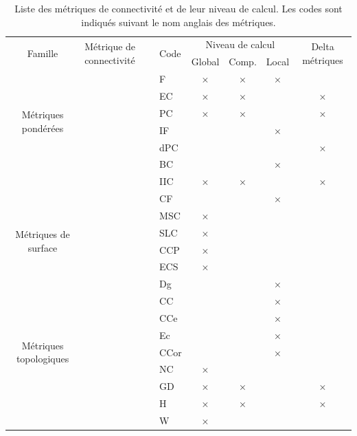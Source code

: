 \documentclass{article}
\begin{document}
\begin{table}[H]
	\begin{tabular}{|c|p{7cm}|l|c|c|c|c|}
		\hline
		\multirow{2}{*}{Famille} & \multirow{2}{*}{Métrique de connectivité} & \multirow{2}{*}{Code} & \multicolumn{3}{m{3cm}|}{\centering Niveau de calcul} & \multirow{2}{1.5cm}{Delta métriques}\\
		\hhline{~~~---~}
		&  &  & Global & Comp. & Local & \\
		\hline
		\multirow{6}{2cm}{Métriques pondérées}
		& \nameref{metric_F} & F & × & × & × & \\
		& \nameref{metric_EC} & EC & × & × &  & ×\\
		& \nameref{metric_PC} & PC & × & × &  & ×\\
		& \nameref{metric_IF} & IF &  &  & × & \\
		& \nameref{metric_dPC} & dPC &  &  &  & ×\\
		& \nameref{metric_BC} & BC &  &  & × & \\
		& \nameref{metric_IIC} & IIC & × & × &  & ×\\
		& \nameref{metric_CF} & CF &  &  & × & \\
		\hline
		\multirow{4}{2cm}{Métriques de surface}
		& \nameref{metric_MSC} & MSC & × &  &  & \\
		& \nameref{metric_SLC} & SLC & × &  &  & \\
		& \nameref{metric_CCP} & CCP & × &  &  & \\
		& \nameref{metric_ECS} & ECS & × &  &  & \\
		\hline
		\multirow{9}{2cm}{Métriques topologiques}
		& \nameref{metric_Dg} & Dg &  &  & × & \\
		& \nameref{metric_CC} & CC &  &  & × & \\
		& \nameref{metric_CCe} & CCe &  &  & × & \\
		& \nameref{metric_Ec} & Ec &  &  & × & \\
		& \nameref{metric_CCor} & CCor &  &  & × & \\
		& \nameref{metric_NC} & NC & × &  &  & \\
		& \nameref{metric_GD} & GD & × & × &  & ×\\
		& \nameref{metric_H} & H & × & × &  & ×\\
		& \nameref{metric_W} & W & × &  &  & \\
		\hline
	\end{tabular}
	\caption{Liste des métriques de connectivité et de leur niveau de calcul. Les codes sont indiqués suivant le nom anglais des métriques.}
	\label{metric_level}
\end{table}
\end{document}
